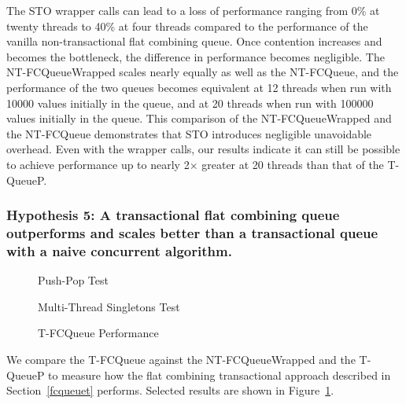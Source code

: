 The STO wrapper calls can lead to a loss of performance ranging from 0\% at twenty threads to 40\% at four threads compared to the performance of the vanilla non-transactional flat combining queue. Once contention increases and becomes the bottleneck, the difference in performance becomes negligible. The NT-FCQueueWrapped scales nearly equally as well as the NT-FCQueue, and the performance of the two queues becomes equivalent at 12 threads when run with 10000 values initially in the queue, and at 20 threads when run with 100000 values initially in the queue. This comparison of the NT-FCQueueWrapped and the NT-FCQueue demonstrates that STO introduces negligible unavoidable overhead. Even with the wrapper calls, our results indicate it can still be possible to achieve performance up to nearly 2$\times$ greater at 20 threads than that of the T-QueueP.

\vspace{12pt}
\noindent{}

\subsubsection{Hypothesis 5: A transactional flat combining queue outperforms and scales better than a transactional queue with a naive concurrent algorithm.}

\begin{figure}[H]
    \centering
	\begin{minipage}{0.75\textwidth}
        \caption*{Push-Pop Test}
        \vspace{12pt}
	\end{minipage}
   	\begin{minipage}{0.75\textwidth}
        \caption*{Multi-Thread Singletons Test}
	\end{minipage}
        \caption{T-FCQueue Performance}
    \label{fig:tqs}
\end{figure}

We compare the T-FCQueue against the NT-FCQueueWrapped and the T-QueueP to measure how the flat combining transactional approach described in Section~\ref{fcqueuet} performs. Selected results are shown in Figure~\ref{fig:tqs}.

